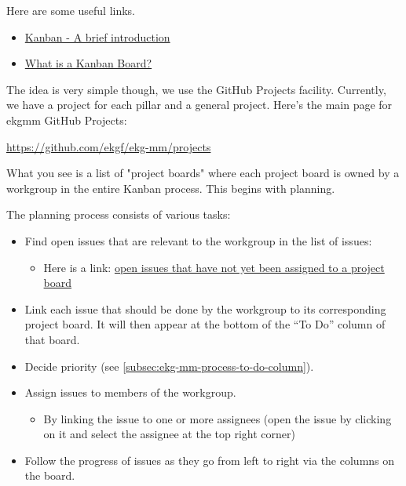 Here are some useful links. 

\begin{itemize}
    \item \href{https://www.atlassian.com/agile/kanban}{Kanban - A brief introduction}
    \item \href{https://www.atlassian.com/agile/kanban/boards}{What is a Kanban Board?}
\end{itemize}

The idea is very simple though, we use the GitHub Projects facility. 
Currently, we have a project for each pillar and a general project. 
Here’s the main page for \gls{ekgmm} GitHub Projects:

\begin{center}
    \url{https://github.com/ekgf/ekg-mm/projects}
\end{center}

What you see is a list of "project boards" where each project board 
is owned by a workgroup in the entire Kanban process. 
This begins with planning. 

The planning process consists of various tasks:

\begin{itemize}
    \item Find open issues that are relevant to the workgroup in the list of issues:
    \begin{itemize}
        \item Here is a link: \href{https://github.com/EKGF/ekg-mm/issues?q=is%3Aissue+is%3Aopen+no%3Aproject}
              {open issues that have not yet been assigned to a project board}
    \end{itemize}
    \item Link each issue that should be done by the workgroup to its
          corresponding project board.
          It will then appear at the bottom of the “To Do” column of that board.
    \item Decide priority (see \ref{subsec:ekg-mm-process-to-do-column}).
    \item Assign issues to members of the workgroup.
    \begin{itemize}
        \item By linking the issue to one or more assignees
              (open the issue by clicking on it and select the assignee at
              the top right corner)
    \end{itemize}
    \item Follow the progress of issues as they go from left to right via the columns on the board.
\end{itemize}


